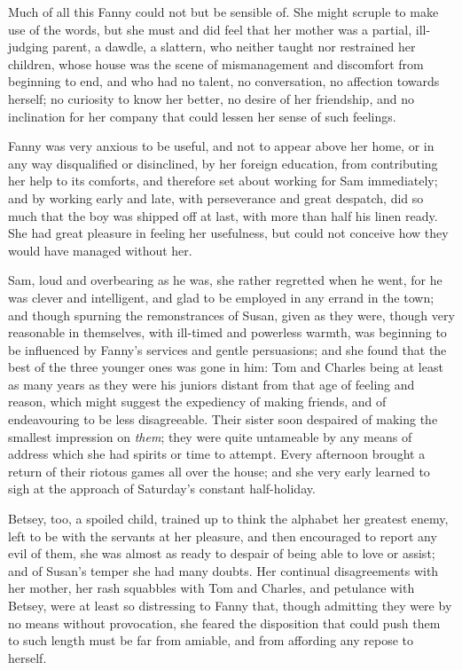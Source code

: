 \documentclass{article}
\begin{document}
Much of all this Fanny could not but be sensible of.
She might scruple to make use of the words, but she
must and did feel that her mother was a partial,
ill-judging parent, a dawdle, a slattern, who neither taught
nor restrained her children, whose house was the scene
of mismanagement and discomfort from beginning to end,
and who had no talent, no conversation, no affection
towards herself; no curiosity to know her better,
no desire of her friendship, and no inclination for her
company that could lessen her sense of such feelings.

Fanny was very anxious to be useful, and not to appear above
her home, or in any way disqualified or disinclined, by her
foreign education, from contributing her help to its comforts,
and therefore set about working for Sam immediately;
and by working early and late, with perseverance and
great despatch, did so much that the boy was shipped
off at last, with more than half his linen ready.
She had great pleasure in feeling her usefulness, but could
not conceive how they would have managed without her.

Sam, loud and overbearing as he was, she rather regretted
when he went, for he was clever and intelligent, and glad
to be employed in any errand in the town; and though
spurning the remonstrances of Susan, given as they were,
though very reasonable in themselves, with ill-timed
and powerless warmth, was beginning to be influenced
by Fanny's services and gentle persuasions; and she found
that the best of the three younger ones was gone in him:
Tom and Charles being at least as many years as they were
his juniors distant from that age of feeling and reason,
which might suggest the expediency of making friends,
and of endeavouring to be less disagreeable.  Their sister
soon despaired of making the smallest impression on \emph{them};
they were quite untameable by any means of address which she
had spirits or time to attempt.  Every afternoon brought
a return of their riotous games all over the house; and she
very early learned to sigh at the approach of Saturday's
constant half-holiday.

Betsey, too, a spoiled child, trained up to think the
alphabet her greatest enemy, left to be with the servants
at her pleasure, and then encouraged to report any evil
of them, she was almost as ready to despair of being
able to love or assist; and of Susan's temper she had
many doubts.  Her continual disagreements with her mother,
her rash squabbles with Tom and Charles, and petulance
with Betsey, were at least so distressing to Fanny that,
though admitting they were by no means without provocation,
she feared the disposition that could push them to such
length must be far from amiable, and from affording
any repose to herself.
\end{document}

